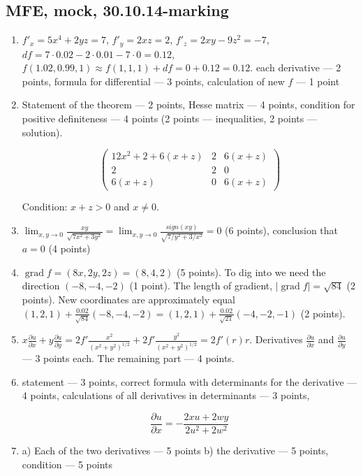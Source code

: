 \documentclass[12pt]{article} %
\theoremstyle{definition} %
\DeclareMathOperator{\grad}{grad}
\providecommand{\grad}{\mathrm{grad}\,}
\begin{document}
\subsection{MFE, mock, 30.10.14-marking}

\begin{enumerate}
\item $f'_x=5x^4+2yz=7$, $f'_y=2xz=2$, $f'_z=2xy-9z^2=-7$, $df=7\cdot 0.02-2\cdot 0.01-7\cdot 0=0.12$, $f(1.02,0.99,1)\approx f(1,1,1)+df=0+0.12=0.12$.
each derivative --- 2 points, formula for differential --- 3 points, calculation of new $f$ --- 1 point

\item  Statement of the theorem --- 2 points, Hesse matrix --- 4 points, condition for positive definiteness --- 4 points (2 points --- inequalities, 2 points --- solution).

\[
\begin{pmatrix}
12x^2+2+6(x+z) & 2 & 6(x+z) \\
2 & 2 & 0 \\
6(x+z) & 0 & 6(x+z)
\end{pmatrix}
\]

Condition: $x+z>0$ and $x\neq 0$.


\item $\lim_{x,y\to 0} \frac{xy}{\sqrt{7x^2+3y^2}}=\lim_{x,y\to 0} \frac{sign(xy)}{\sqrt{7/y^2+3/x^2}}=0$ (6 points), conclusion that $a=0$ (4 points)
\item $\grad f=(8x, 2y, 2z)=(8, 4, 2)$ (5 points). To dig into we need the direction $(-8, -4,-2)$ (1 point). The length of gradient, $|\grad f| = \sqrt{84}$ (2 points). New coordinates are approximately equal $(1,2,1)+\frac{0.02}{\sqrt{84}}(-8,-4,-2)=(1,2,1)+\frac{0.02}{\sqrt{21}}(-4,-2,-1)$ (2 points).

\item $x\frac{\partial u}{\partial x}+y\frac{\partial u}{\partial y}=2f'\frac{x^2}{(x^2+y^2)^{1/2}}+2f'\frac{y^2}{(x^2+y^2)^{1/2}}=2f'(r)r$. Derivatives $\frac{\partial u}{\partial x}$ and $\frac{\partial u}{\partial y}$ --- 3 points each. The remaining part --- 4 points.

\item statement --- 3 points, correct formula with determinants for the derivative --- 4 points, calculations of all derivatives in determinants --- 3 points,

\[
\frac{\partial u}{\partial x}=- \frac{2xu+2wy}{2u^2+2w^2}
\]

\item a) Each of the two derivatives --- 5 points b) the derivative --- 5 points, condition --- 5 points


\end{enumerate}
\end{document}
